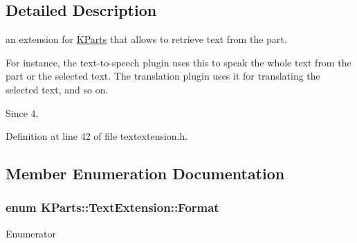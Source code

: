 \subsection{Detailed Description}
an extension for \hyperlink{namespaceKParts}{K\+Parts} that allows to retrieve text from the part. 

For instance, the text-\/to-\/speech plugin uses this to speak the whole text from the part or the selected text. The translation plugin uses it for translating the selected text, and so on.

\begin{DoxySince}{Since}
4. 
\end{DoxySince}


Definition at line 42 of file textextension.\+h.



\subsection{Member Enumeration Documentation}
\hypertarget{classKParts_1_1TextExtension_a65ad08598c74eae19f0c7772a251685d}{
\subsubsection[{Format}]{\setlength{\rightskip}{0pt plus 5cm}enum {\bf K\+Parts\+::\+Text\+Extension\+::\+Format}}}\label{classKParts_1_1TextExtension_a65ad08598c74eae19f0c7772a251685d}
\begin{Desc}
\item[Enumerator]\par
\begin{description}
\item[{\em 
\hypertarget{classKParts_1_1TextExtension_a65ad08598c74eae19f0c7772a251685da8bb1bd219fcb9237fae7b81b6d640f96}{Plain\+Text}\label{classKParts_1_1TextExtension_a65ad08598c74eae19f0c7772a251685da8bb1bd219fcb9237fae7b81b6d640f96}
}]\item[{\em 
\hypertarget{classKParts_1_1TextExtension_a65ad08598c74eae19f0c7772a251685da330994e99d37a75f3720547767822f37}{H\+T\+M\+L}\label{classKParts_1_1TextExtension_a65ad08598c74eae19f0c7772a251685da330994e99d37a75f3720547767822f37}
}]\end{description}
\end{Desc}


